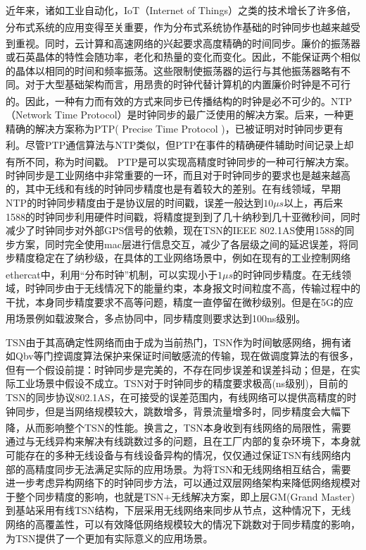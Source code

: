 \documentclass[UTF8,a4paper,12pt]{ctexart}
\numberwithin{equation}{section}
\begin{document}
	近年来，诸如工业自动化，IoT（Internet of Things）之类的技术增长了许多倍，分布式系统的应用变得至关重要\textsuperscript{\cite{7879243}}，作为分布式系统协作基础的时钟同步也越来越受到重视。同时，云计算和高速网络的兴起要求高度精确的时间同步\textsuperscript{\cite{CHEN20143}}。廉价的振荡器或石英晶体的特性会随功率，老化和热量的变化而变化。因此，不能保证两个相似的晶体以相同的时间和频率振荡。这些限制使振荡器的运行与其他振荡器略有不同。对于大型基础架构而言，用昂贵的时钟代替计算机的内置廉价时钟是不可行的。因此，一种有力而有效的方式来同步已传播结构的时钟是必不可少的\textsuperscript{\cite{8278257}}。NTP（Network Time Protocol）是时钟同步的最广泛使用的解决方案。后来，一种更精确的解决方案称为PTP( Precise Time Protocol )，已被证明对时钟同步更有利\textsuperscript{\cite{5223605}}。尽管PTP通信算法与NTP类似，但PTP在事件的精确硬件辅助时间记录上却有所不同，称为时间戳\textsuperscript{\cite{ahmed2018survey}}。 PTP是可以实现高精度时钟同步的一种可行解决方案。时钟同步是工业网络中非常重要的一环，而且对于时钟同步的要求也是越来越高的，其中无线和有线的时钟同步精度也是有着较大的差别。在有线领域，早期NTP的时钟同步精度由于是协议层的时间戳，误差一般达到$10\mu s$以上，再后来1588的时钟同步利用硬件时间戳，将精度提到到了几十纳秒到几十亚微秒间，同时减少了时钟同步对外部GPS信号的依赖，现在TSN的IEEE 802.1AS使用1588的同步方案，同时完全使用mac层进行信息交互，减少了各层级之间的延迟误差，将同步精度稳定在了纳秒级，在具体的工业网络场景中，例如在现有的工业控制网络ethercat中，利用“分布时钟”机制，可以实现小于$1 \mu s$的时钟同步精度\textsuperscript{\cite{idrees2020ieee}}。在无线领域，时钟同步由于无线情况下的能量约束，本身报文时间粒度不高，传输过程中的干扰，本身同步精度要求不高等问题，精度一直停留在微秒级别。但是在5G的应用场景例如载波聚合，多点协同中，同步精度则要求达到100ns级别\textsuperscript{\cite{jakovetic2014fast}}。
	
	
	TSN由于其高确定性网络而由于成为当前热门，TSN作为时间敏感网络，拥有诸如Qbv等门控调度算法保护来保证时间敏感流的传输，现在做调度算法的有很多，但有一个假设前提：时钟同步是完美的，不存在同步误差和误差抖动；但是，在实际工业场景中假设不成立。TSN对于时钟同步的精度要求极高(ns级别)，目前的TSN的同步协议802.1AS，在可接受的误差范围内，有线网络可以提供高精度的时钟同步，但是当网络规模较大，跳数增多，背景流量增多时，同步精度会大幅下降，从而影响整个TSN的性能\textsuperscript{\cite{ieee2011ieee}}。换言之，TSN本身收到有线网络的局限性，需要通过与无线异构来解决有线跳数过多的问题，且在工厂内部的复杂环境下，本身就可能存在的多种无线设备与有线设备异构的情况，仅仅通过保证TSN有线网络内部的高精度同步无法满足实际的应用场景。为将TSN和无线网络相互结合，需要进一步考虑异构网络下的时钟同步方法，可以通过双层网络架构来降低网络规模对于整个同步精度的影响，也就是TSN+无线解决方案，即上层GM(Grand Master)到基站采用有线TSN结构，下层采用无线网络来同步从节点，这种情况下，无线网络的高覆盖性，可以有效降低网络规模较大的情况下跳数对于同步精度的影响，为TSN提供了一个更加有实际意义的应用场景。
	
\end{document}
